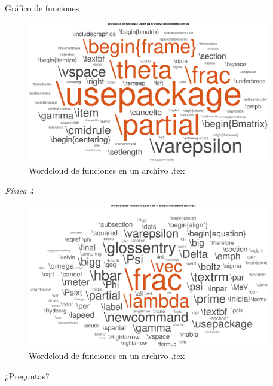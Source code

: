 \documentclass[10pt]{beamer}
\begin{document}
\begin{frame}{Gráfico de funciones} 
\vspace{0.2cm}
\begin{figure}
\begin{centering}
\includegraphics[width=10.6cm]{fig/self.eps}
\caption{Wordcloud de funciones en un archivo .tex}
\end{centering}
\end{figure}
\end{frame}

\begin{frame}{\emph{Física 4}} 
\vspace{0.2cm}
\begin{figure}
\begin{centering}
\includegraphics[width=10.6cm]{fig/fisca4.eps}
\caption{Wordcloud de funciones en un archivo .tex}
\end{centering}
\end{figure}
\end{frame}

{
\begin{frame}[standout]
¿Preguntas?
\end{frame}
}
\end{document}
